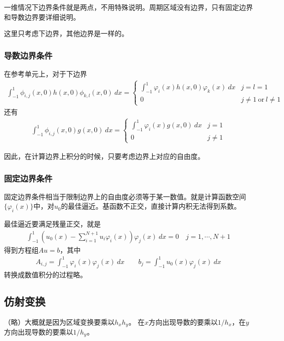 \documentclass[12pt,a4paper]{article}
\begin{document}
一维情况下边界条件就是两点，不用特殊说明。周期区域没有边界，只有固定边界和导数边界要详细说明。

这里只考虑下边界，其他边界是一样的。

\subsubsection{导数边界条件}

在参考单元上，对于下边界
\begin{align*}
\int_{-1}^{1} \phi_{i,j}(x,0) h(x,0) \phi_{k,l}(x,0) \ dx = 
\left\{
\begin{array}{ll}
\int_{-1}^{1} \varphi_i(x) h(x,0) \varphi_k(x) \ dx & j = l = 1 \\
0 & j \neq 1 \ \text{or} \ l \neq 1
\end{array}
\right.
\end{align*}
还有
\begin{align*}
\int_{-1}^{1} \phi_{i,j}(x,0) g(x,0) \ dx = 
\left\{
\begin{array}{ll}
\int_{-1}^{1} \varphi_i(x) g(x,0) \ dx & j = 1 \\
0 & j \neq 1
\end{array}
\right.
\end{align*}

因此，在计算边界上积分的时候，只要考虑边界上对应的自由度。

\subsubsection{固定边界条件}

固定边界条件相当于限制边界上的自由度必须等于某一数值。就是计算函数空间$\{\varphi_i(x)\}$中，对$u_0$的最佳逼近。基函数不正交，直接计算内积无法得到系数。

最佳逼近要满足残量正交，就是
\begin{align*}
\int_{-1}^{1} (u_0(x) - \sum_{i=1}^{N+1} u_i \varphi_i(x)) \varphi_j(x) \ dx = 0 \quad j = 1,\cdots,N+1
\end{align*}
得到方程组$A u = b$，其中
\begin{align*}
A_{i,j} = \int_{-1}^{1} \varphi_i(x) \varphi_j(x) \ dx \qquad b_j = \int_{-1}^{1} u_0(x) \varphi_j(x) \ dx
\end{align*}
转换成数值积分的过程略。

\subsection{仿射变换}

（略）大概就是因为区域变换要乘以$h_x h_y$。
在$x$方向出现导数的要乘以$1/h_x$，在$y$方向出现导数的要乘以$1/h_y$。
\end{document}

